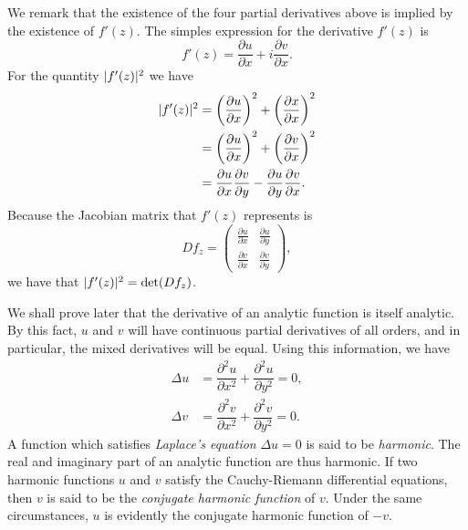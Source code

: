 We remark that the existence of the four partial derivatives above is implied by the existence of $f'(z)$. The simples expression for the derivative $f'(z)$ is $$f'(z)=\dfrac{\partial u}{\partial x}+i\dfrac{\partial v}{\partial x}.$$ For the quantity $\lvert f'(z) \rvert^2$ we have
\begin{align*}
	\lvert f'(z) \rvert^2 &=\left(\dfrac{\partial u}{\partial x}\right)^2+\left(\dfrac{\partial x}{\partial x}\right)^2 \\
	&=\left(\dfrac{\partial u}{\partial x}\right)^2+\left(\dfrac{\partial v}{\partial x}\right)^2 \\
	&=\dfrac{\partial u}{\partial x}\dfrac{\partial v}{\partial y}-\dfrac{\partial u}{\partial y}\dfrac{\partial v}{\partial x}.
\end{align*}
Because the Jacobian matrix that $f'(z)$ represents is $$Df_z=\begin{pmatrix}
	\frac{\partial u}{\partial x} & \frac{\partial u}{\partial y} \\
	\frac{\partial v}{\partial x} & \frac{\partial v}{\partial y}
\end{pmatrix},$$ we have that $\lvert f'(z) \rvert^2=\det (Df_z)$.

We shall prove later that the derivative of an analytic function is itself analytic. By this fact, $u$ and $v$ will have continuous partial derivatives of all orders, and in particular, the mixed derivatives will be equal. Using this information, we have
\begin{align*}
	\Delta u &=\dfrac{\partial^2 u}{\partial x^2}+\dfrac{\partial^2 u}{\partial y^2}=0, \\
	\Delta v &=\dfrac{\partial^2 v}{\partial x^2}+\dfrac{\partial^2 v}{\partial y^2}=0.
\end{align*}
A function which satisfies \textit{Laplace's equation} $\Delta u=0$ is said to be \textit{harmonic}. The real and imaginary part of an analytic function are thus harmonic. If two harmonic functions $u$ and $v$ satisfy the Cauchy-Riemann differential equations, then $v$ is said to be the \emph{conjugate harmonic function} of $v$. Under the same circumstances, $u$ is evidently the conjugate harmonic function of $-v$.

